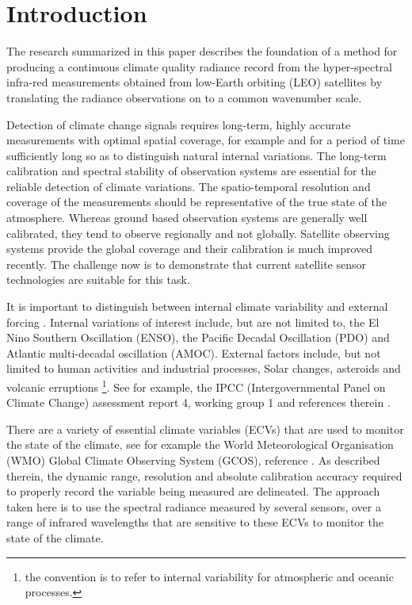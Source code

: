 \documentclass[twocolumn,10pt]{article}
\begin{document}
\section{Introduction}

The research summarized in this paper describes the foundation of a method for producing a continuous climate quality radiance record from the hyper-spectral infra-red measurements obtained from low-Earth orbiting (LEO) satellites by translating the radiance observations on to a common wavenumber scale.

Detection of climate change signals requires long-term, highly accurate measurements with optimal spatial coverage, for example \cite{wielicki2013} and for a period of time sufficiently long so as to distinguish natural internal variations. The long-term calibration and spectral stability of observation systems are essential for the reliable detection of climate variations. The spatio-temporal resolution and coverage of the measurements should be representative of the true state of the atmosphere. Whereas ground based observation systems are generally well calibrated, they tend to observe regionally and not globally. Satellite observing systems provide the global coverage and their calibration is much improved recently. The challenge now is to demonstrate that current satellite sensor technologies are suitable for this task.

It is important to distinguish between internal climate variability and external forcing \cite{solomon2010}. Internal variations of interest include, but are not limited to, the El Nino Southern Oscillation (ENSO), the Pacific Decadal Oscillation (PDO) and Atlantic multi-decadal oscillation (AMOC). External factors include, but not limited to human activities and industrial processes, Solar changes, asteroids and volcanic erruptions \footnote{the convention is to refer to internal variability for atmospheric and oceanic processes. }. See for example, the IPCC (Intergovernmental Panel on Climate Change) assessment report 4, working group 1 and references therein \cite{ipcc2007_wg1}. 

There are a variety of essential climate variables (ECVs) that are used to monitor the state of the climate, see for example the World Meteorological Organisation (WMO) Global Climate Observing System (GCOS), reference \cite{gcos}. As described therein, the dynamic range, resolution and absolute calibration accuracy required to properly record the variable being measured are delineated. The approach taken here is to use the spectral radiance measured by several sensors, over a range of infrared wavelengths that are sensitive to these ECVs to monitor the state of the climate.
\end{document}
